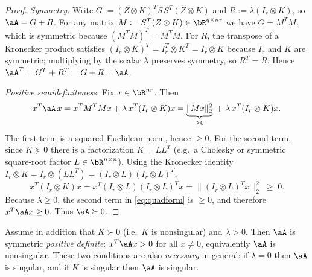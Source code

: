 \begin{proof}
\emph{Symmetry.} Write $G:=(Z\otimes K)^{T} S\,S^{T} (Z\otimes K)$ and
$R:=\lambda(I_r\otimes K)$, so $\aA=G+R$.
For any matrix $M:=S^{T}(Z\otimes K)\in\bR^{q\times nr}$ we have
$G=M^{T}M$, which is symmetric because $(M^{T}M)^{T}=M^{T}M$.
For $R$, the transpose of a Kronecker product satisfies
$(I_r\otimes K)^{T}=I_r^{T}\otimes K^{T}=I_r\otimes K$ because $I_r$ and $K$
are symmetric; multiplying by the scalar $\lambda$ preserves symmetry, so
$R^{T}=R$. Hence $\aA^{T}=G^{T}+R^{T}=G+R=\aA$.

\smallskip
\emph{Positive semidefiniteness.} Fix $x\in\bR^{nr}$. Then
\begin{equation}\label{eq:quadform}
  x^{T}\aA\,x
  = x^{T}M^{T}M x + \lambda\, x^{T}(I_r\otimes K)x
  = \underbrace{\|Mx\|_2^{2}}_{\ge0}
   \;+\; \lambda\, x^{T}(I_r\otimes K)x .
\end{equation}
The first term is a squared Euclidean norm, hence $\ge0$. For the second term,
since $K\succeq0$ there is a factorization $K=L L^{T}$ (e.g.\ a Cholesky or
symmetric square-root factor $L\in\bR^{n\times n}$). Using the Kronecker
identity $I_r\otimes K=I_r\otimes(LL^{T})=(I_r\otimes L)(I_r\otimes L)^{T}$,
\[
  x^{T}(I_r\otimes K)x
  = x^{T}(I_r\otimes L)(I_r\otimes L)^{T}x
  = \bigl\|(I_r\otimes L)^{T}x\bigr\|_2^{2}\;\ge\;0 .
\]
Because $\lambda\ge0$, the second term in \eqref{eq:quadform} is $\ge0$, and
therefore $x^{T}\aA x\ge0$. Thus $\aA\succeq0$.
\end{proof}

\begin{lemma}\label{lem:spd}
Assume in addition that $K\succ0$ (i.e.\ $K$ is nonsingular) and $\lambda>0$.
Then $\aA$ is symmetric \emph{positive definite}: $x^{T}\aA x>0$ for all
$x\neq0$, equivalently $\aA$ is nonsingular. These two conditions are also
\emph{necessary} in general: if $\lambda=0$ then $\aA$ is singular, and if
$K$ is singular then $\aA$ is singular.
\end{lemma}

